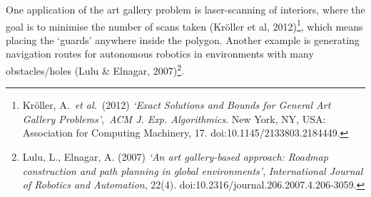 \documentclass[
]{article}
\begin{document}
One application of the art gallery problem is laser-scanning of
interiors, where the goal is to minimise the number of scans taken
(Kröller et al, 2012)\footnote{Kröller, A.~\emph{et al.}~(2012)
  \emph{`Exact Solutions and Bounds for General Art Gallery
  Problems'},~\emph{ACM J. Exp. Algorithmics}. New York, NY, USA:
  Association for Computing Machinery, 17. doi:10.1145/2133803.2184449.},
which means placing the `guards' anywhere inside the polygon. Another
example is generating navigation routes for autonomous robotics in
environments with many obstacles/holes (Lulu \& Elnagar,
2007)\footnote{Lulu, L., Elnagar, A. (2007) \emph{`An art gallery-based
  approach: Roadmap construction and path planning in global
  environments'}, \emph{International Journal of Robotics and
  Automation}, 22(4). doi:10.2316/journal.206.2007.4.206-3059.}.
\end{document}
